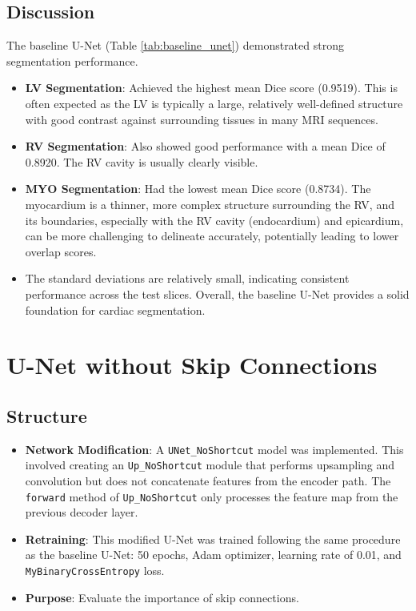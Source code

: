 \documentclass{article}
\begin{document}
\subsection{Discussion}
The baseline U-Net (Table \ref{tab:baseline_unet}) demonstrated strong segmentation performance.
\begin{itemize}
  \item \textbf{LV Segmentation}: Achieved the highest mean Dice score (0.9519). This is often expected as the LV is typically a large, relatively well-defined structure with good contrast against surrounding tissues in many MRI sequences.
  \item \textbf{RV Segmentation}: Also showed good performance with a mean Dice of 0.8920. The RV cavity is usually clearly visible.
  \item \textbf{MYO Segmentation}: Had the lowest mean Dice score (0.8734). The myocardium is a thinner, more complex structure surrounding the RV, and its boundaries, especially with the RV cavity (endocardium) and epicardium, can be more challenging to delineate accurately, potentially leading to lower overlap scores.
  \item The standard deviations are relatively small, indicating consistent performance across the test slices. Overall, the baseline U-Net provides a solid foundation for cardiac segmentation.
\end{itemize}


\section{U-Net without Skip Connections}

\subsection{Structure}
\begin{itemize}
  \item \textbf{Network Modification}: A \texttt{UNet\_NoShortcut} model was implemented. This involved creating an
        \texttt{Up\_NoShortcut} module that performs upsampling and convolution but does not concatenate features from the encoder
        path. The \texttt{forward} method of \texttt{Up\_NoShortcut} only processes the feature map from the previous decoder layer.
  \item \textbf{Retraining}: This modified U-Net was trained following the same procedure as the baseline U-Net: 50 epochs, Adam optimizer, learning rate of 0.01, and \texttt{MyBinaryCrossEntropy} loss.
  \item \textbf{Purpose}: Evaluate the importance of skip connections.
\end{itemize}
\end{document}
